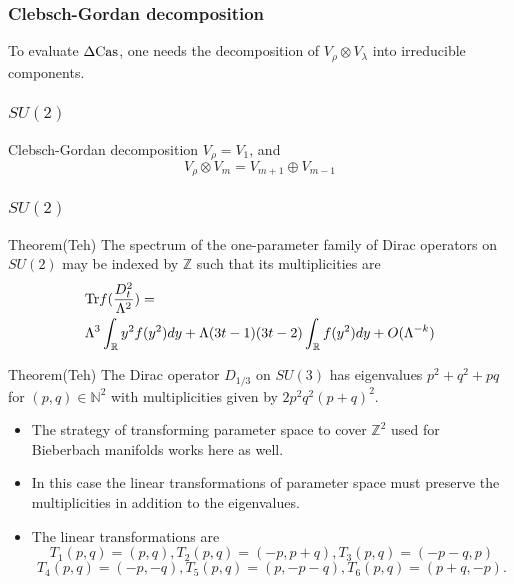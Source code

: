 \documentclass{beamer}
\def\N{{\mathbb N}}
\def\Z{{\mathbb Z}}
\def\R{{\mathbb R}}
\def\Cas{{\rm Cas}}
\def\Tr{{\rm Tr}}
\begin{document}
\begin{frame}
	\frametitle{Clebsch-Gordan decomposition}
	To evaluate $\Delta \Cas$, one needs the decomposition of $V_{\rho} \otimes V_{\lambda}$ into irreducible components.
\end{frame}

\begin{frame}
	\frametitle{$SU(2)$}
	\begin{block}{Clebsch-Gordan decomposition}
		$V_{\rho} = V_{1}$, and 
		\[
		V_{\rho} \otimes V_m = V_{m+1} \oplus V_{m-1}
		\]
	\end{block}
\end{frame}

\begin{frame}
	\frametitle{$SU(2)$}
  \begin{block}{Theorem(Teh)}
	The spectrum of the one-parameter family of Dirac operators on $SU(2)$ may be indexed by $\Z$ such that its multiplicities are 
	\begin{align*}
		& \Tr f( \frac{D_t ^2}{\Lambda ^2}) = \\ 
		&\Lambda ^3 \int_{\R}y^2 f(y^2) dy + \Lambda(3t-1)(3t-2)\int_\R f(y^2) dy + O(\Lambda^{-k})
	\end{align*}
  \end{block}
\end{frame}

\begin{frame}
  \begin{block}{Theorem(Teh)}
    The Dirac operator $D_{1/3}$ on $SU(3)$ has eigenvalues $p^2 + q^2 + pq$ for $(p,q) \in \N^2$ with multiplicities given by $2p^2q^2(p+q)^2$.
  \end{block}

  \begin{block}{}
    \begin{itemize}
      \item The strategy of transforming parameter space to cover $\Z^2$ used for Bieberbach manifolds works here as well.
      \item In this case the linear transformations of parameter space must preserve the multiplicities in addition to the eigenvalues.
      \item The linear transformations are 
\[
T_1 (p,q) = (p,q), T_2(p,q) = (-p,p+q), T_3(p,q) = (-p-q,p)
\]
\[T_4(p,q) = (-p,-q),  T_5(p,q) = (p,-p-q), T_6(p,q) = (p+q,-p).
\]
    \end{itemize}
  \end{block}
\end{frame}
\end{document}
